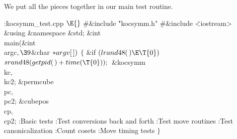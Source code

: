 We put all the pieces together in our main test routine.

\Y\B\4:\.{kocsymm\_test.cpp }\X${}\E{}$\6
\8\#\&{include} \.{"kocsymm.h"}\6
\8\#\&{include} \.{<iostream>}\6
\&{using} \&{namespace} \&{std};\7
\&{int} \\{main}(\&{int} \\{argc}${},\39{}$\&{char} ${}{*}\\{argv}[\,]){}$\1\1%
\2\2\6
${}\{{}$\1\6
\&{if} ${}(\\{lrand48}(\,)\E\T{0}){}$\1\5
${}\\{srand48}(\\{getpid}(\,)+\\{time}(\T{0}));{}$\2\7
\&{kocsymm} \\{kc}${},{}$ \\{kc2};\6
\&{permcube} \\{pc}${},{}$ \\{pc2};\6
\&{cubepos} \\{cp}${},{}$ \\{cp2};\7
:Basic tests\X\6
:Test conversions back and forth\X\6
:Test move routines\X\6
:Test canonicalization\X\6
:Count cosets\X\6
:Move timing tests\X\6
\4${}\}{}$\2\par
\fi

\inx
\fin
\con
